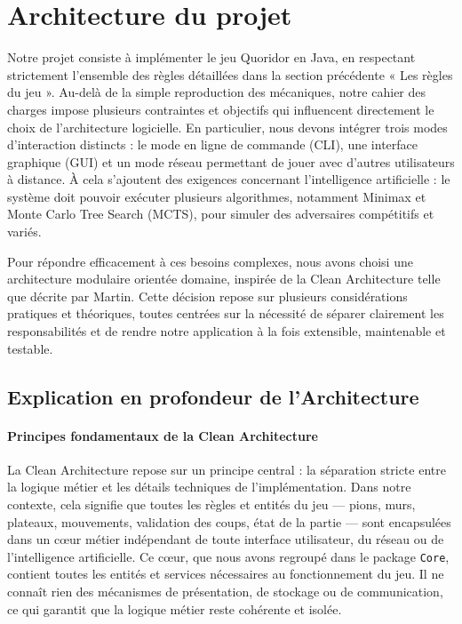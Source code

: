 \documentclass[a4paper]{article}
\begin{document}
\newpage
\section{Architecture du projet}

Notre projet  consiste à implémenter le jeu Quoridor en Java, en respectant strictement l’ensemble des règles détaillées
dans la section précédente « Les règles du jeu ». Au-delà de la simple reproduction des mécaniques, notre cahier des charges
impose plusieurs contraintes et objectifs qui influencent directement le choix de l’architecture logicielle.
En particulier, nous devons intégrer trois modes d’interaction distincts : le mode en ligne de commande (CLI),
une interface graphique (GUI) et un mode réseau permettant de jouer avec d’autres utilisateurs à distance.
À cela s’ajoutent des exigences concernant l’intelligence artificielle : le système doit pouvoir exécuter plusieurs algorithmes,
notamment Minimax et Monte Carlo Tree Search (MCTS), pour simuler des adversaires compétitifs et variés.

Pour répondre efficacement à ces besoins complexes, nous avons choisi une architecture modulaire orientée domaine,
inspirée de la Clean Architecture telle que décrite par Martin\cite{martin2017clean}. Cette décision repose sur plusieurs
considérations pratiques et théoriques, toutes centrées sur la nécessité de séparer clairement les responsabilités et
de rendre notre application à la fois extensible, maintenable et testable.

\subsection{Explication en profondeur de l’Architecture }

\paragraph{Principes fondamentaux de la Clean Architecture}

La Clean Architecture repose sur un principe central : la séparation stricte entre la logique métier et les détails techniques
de l’implémentation. Dans notre contexte, cela signifie que toutes les règles et entités du jeu — pions, murs, plateaux, mouvements,
validation des coups, état de la partie — sont encapsulées dans un cœur métier indépendant de toute interface utilisateur,
du réseau ou de l’intelligence artificielle. Ce cœur, que nous avons regroupé dans le package \texttt{Core}, contient toutes
les entités et services nécessaires au fonctionnement du jeu. Il ne connaît rien des mécanismes de présentation, de stockage
ou de communication, ce qui garantit que la logique métier reste cohérente et isolée.
\end{document}
